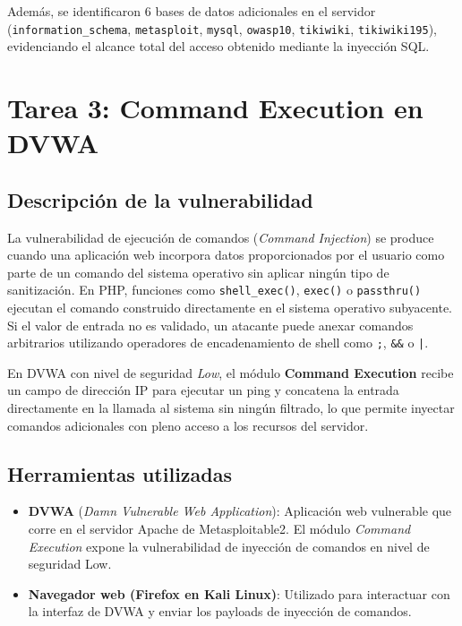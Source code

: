 \documentclass[12pt, letterpaper]{article}
\begin{document}
Además, se identificaron 6 bases de datos adicionales en el servidor (\texttt{information\_schema}, \texttt{metasploit}, \texttt{mysql}, \texttt{owasp10}, \texttt{tikiwiki}, \texttt{tikiwiki195}), evidenciando el alcance total del acceso obtenido mediante la inyección SQL.

\section{Tarea 3: Command Execution en DVWA}

\subsection{Descripción de la vulnerabilidad}

La vulnerabilidad de ejecución de comandos (\textit{Command Injection}) se produce cuando una aplicación web incorpora datos proporcionados por el usuario como parte de un comando del sistema operativo sin aplicar ningún tipo de sanitización. En PHP, funciones como \texttt{shell\_exec()}, \texttt{exec()} o \texttt{passthru()} ejecutan el comando construido directamente en el sistema operativo subyacente. Si el valor de entrada no es validado, un atacante puede anexar comandos arbitrarios utilizando operadores de encadenamiento de shell como \texttt{;}, \texttt{\&\&} o \texttt{|}.

En DVWA con nivel de seguridad \textit{Low}, el módulo \textbf{Command Execution} recibe un campo de dirección IP para ejecutar un ping y concatena la entrada directamente en la llamada al sistema sin ningún filtrado, lo que permite inyectar comandos adicionales con pleno acceso a los recursos del servidor.

\subsection{Herramientas utilizadas}

\begin{itemize}
  \item \textbf{DVWA} (\textit{Damn Vulnerable Web Application}): Aplicación web vulnerable que corre en el servidor Apache de Metasploitable2. El módulo \textit{Command Execution} expone la vulnerabilidad de inyección de comandos en nivel de seguridad Low.
  \item \textbf{Navegador web (Firefox en Kali Linux)}: Utilizado para interactuar con la interfaz de DVWA y enviar los payloads de inyección de comandos.
\end{itemize}
\end{document}
